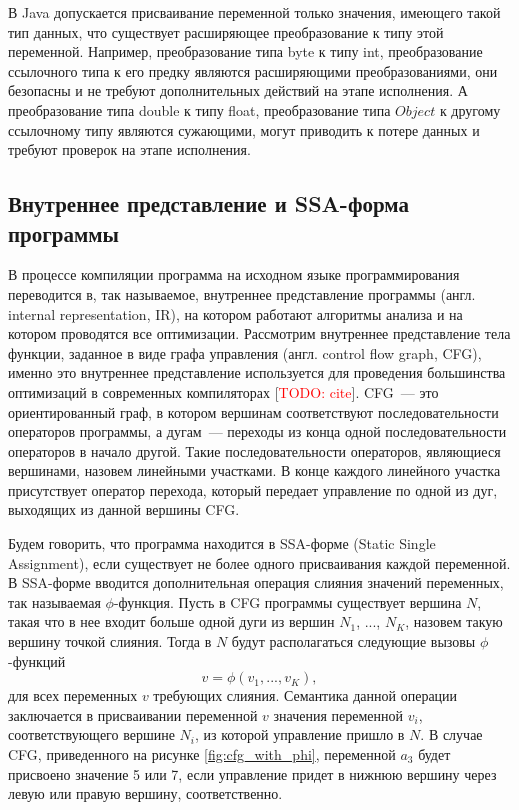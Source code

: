 \documentclass[14pt,titlepage]{extarticle}
\newcommand{\todo}[1]{\textcolor{red}{\eng{TODO}: #1}}
\newcommand{\todocite}{[\todo{cite}]}
\newcommand{\eng}[1]{{\English#1}}
\begin{document}
      В Java допускается присваивание переменной только значения, имеющего
      такой тип данных, что существует расширяющее преобразование к типу этой
      переменной.
      Например, преобразование типа byte к типу int, преобразование ссылочного
      типа к его предку являются расширяющими преобразованиями, они безопасны и
      не требуют дополнительных действий на этапе исполнения.
      А преобразование типа double к типу float, преобразование типа $Object$ к
      другому ссылочному типу являются сужающими, могут приводить к потере
      данных и требуют проверок на этапе исполнения.

    \subsection{Внутреннее представление и SSA-форма программы}
      \label{section:ir_and_ssa}

      В процессе компиляции программа на исходном языке программирования
      переводится в, так называемое, внутреннее представление программы
      (англ. \eng{internal representation, IR}), на котором работают
      алгоритмы анализа и на котором проводятся все оптимизации.
      Рассмотрим внутреннее представление тела функции, заданное в виде
      графа управления (англ. \eng{control flow graph, CFG}), именно это
      внутреннее представление используется для проведения большинства
      оптимизаций в современных компиляторах \todocite.
      CFG~--- это ориентированный граф, в котором вершинам соответствуют
      последовательности операторов программы, а дугам~--- переходы из конца
      одной последовательности операторов в начало другой. Такие
      последовательности операторов, являющиеся вершинами, назовем линейными
      участками. В конце каждого линейного участка присутствует оператор
      перехода, который передает управление по одной из дуг, выходящих из
      данной вершины CFG.

      Будем говорить, что программа находится в SSA-форме (\eng{Static Single
      Assignment}), если существует не более одного присваивания каждой
      переменной. В SSA-форме вводится дополнительная операция слияния значений
      переменных, так называемая $\phi$-функция. Пусть в CFG программы
      существует вершина $N$, такая что в нее входит больше одной дуги из
      вершин $N_1$, ..., $N_K$, назовем такую вершину точкой слияния. Тогда в
      $N$ будут располагаться следующие вызовы $\phi$-функций
      \[ v = \phi(v_1, ..., v_K), \]
      для всех переменных $v$ требующих слияния.
      Семантика данной операции заключается в присваивании переменной $v$
      значения переменной $v_i$, соответствующего вершине $N_i$, из которой
      управление пришло в $N$. В случае CFG, приведенного на рисунке
      \ref{fig:cfg_with_phi}, переменной $a_3$ будет присвоено значение 5 или
      7, если управление придет в нижнюю вершину через левую или правую
      вершину, соответственно.
\end{document}
